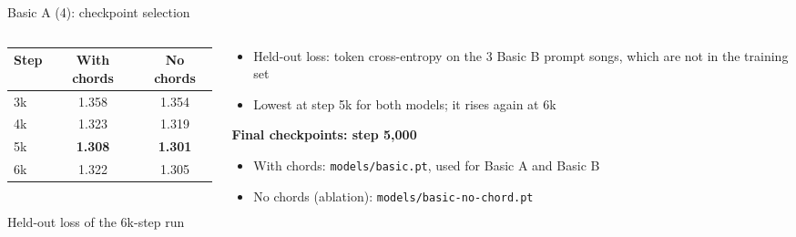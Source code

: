 \documentclass[aspectratio=169,11pt]{beamer}
\newcommand{\best}[1]{\textbf{\alert{#1}}}                       %
\newenvironment{tight}{\begin{itemize}\setlength{\itemsep}{1.5pt}\setlength{\parskip}{0pt}\setlength{\topsep}{0pt}}{\end{itemize}}
\begin{document}
\begin{frame}[t]{Basic A (4): checkpoint selection}
  \begin{columns}[T]
    \begin{column}{0.5\textwidth}
      \small
      \begin{tabular}{@{}lcc@{}}
        \toprule
        Step & With chords & No chords \\ \midrule
        3k & 1.358 & 1.354 \\
        4k & 1.323 & 1.319 \\
        5k & \best{1.308} & \best{1.301} \\
        6k & 1.322 & 1.305 \\
        \bottomrule
      \end{tabular}\\[0.3em]
      {\footnotesize Held-out loss of the 6k-step run}
    \end{column}
    \begin{column}{0.5\textwidth}
      \begin{tight}\small
        \item Held-out loss: token cross-entropy on the 3 Basic B prompt songs, which are not in the training set
        \item Lowest at step 5k for both models; it rises again at 6k
      \end{tight}
      \vspace{0.8em}
      \textbf{Final checkpoints: step 5{,}000}
      \begin{tight}\small
        \item With chords: \texttt{models/basic.pt}, used for Basic A and Basic B
        \item No chords (ablation): \texttt{models/basic-no-chord.pt}
      \end{tight}
    \end{column}
  \end{columns}
\end{frame}
\end{document}
